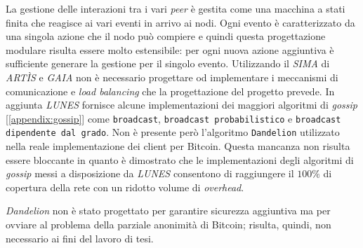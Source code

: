 La gestione delle interazioni tra i vari \textit{peer} è gestita come una macchina a stati finita che reagisce ai vari eventi in arrivo ai nodi. Ogni evento è caratterizzato da una singola azione che il nodo può compiere e quindi questa progettazione modulare risulta essere molto estensibile: per ogni nuova azione aggiuntiva è sufficiente generare la gestione per il singolo evento.\newline
Utilizzando il \textit{SIMA} di \textit{ARTÌS} e \textit{GAIA} non è necessario progettare od implementare i meccanismi di comunicazione e \textit{load balancing} che la progettazione del progetto prevede. In aggiunta \textit{LUNES} fornisce alcune implementazioni dei maggiori algoritmi di \textit{gossip} [\ref{appendix:gossip}] come \texttt{broadcast}, \texttt{broadcast probabilistico} e \texttt{broadcast dipendente dal grado}. Non è presente però l'algoritmo \texttt{Dandelion} utilizzato nella reale implementazione dei client per Bitcoin. Questa mancanza non risulta essere bloccante in quanto è dimostrato\cite{gdalunes} che le implementazioni degli algoritmi di \textit{gossip} messi a disposizione da \textit{LUNES} consentono di raggiungere il $100\%$ di copertura della rete con un ridotto volume di \textit{overhead}.

\textit{Dandelion} non è stato progettato per garantire sicurezza aggiuntiva ma per ovviare al problema della parziale anonimità di Bitcoin; risulta, quindi, non necessario ai fini del lavoro di tesi.


